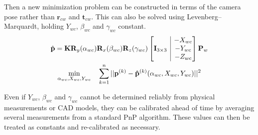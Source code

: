 \documentclass{article}
\makeatletter
\newcommand{\onebytwo}[2]{\ensuremath{\left[\begin{array}{@{}c|c@{}} #1 & #2 \end{array}\right]}}
\makeatother
\begin{document}
Then a new minimization problem can be constructed in terms of the camera pose rather than $\mathbf{r}_{cw}$ and $\mathbf{t}_{cw}$. This can also be solved using Levenberg–Marquardt, holding $Y_{wc}$, $\beta_{wc}$ and $\gamma_{wc}$ constant.
\begin{gather*}
    \hat{\mathbf{p}}=\mathbf{K} \mathbf{R}_y(\alpha_{wc}) \mathbf{R}_x(\beta_{wc}) \mathbf{R}_z(\gamma_{wc}) \onebytwo{\mathbf{I}_{3 \times 3}}{\begin{matrix}-X_{wc} \\ -Y_{wc} \\ -Z_{wc}\end{matrix}}  \mathbf{P}_w \\
    \min_{\alpha_{wc}, X_{wc}, Y_{wc}} \quad \sum_{k=1}^{n}{||\mathbf{p}^{(k)}-\mathbf{\hat{p}}^{(k)}(\alpha_{wc}, X_{wc}, Y_{wc})||^2}
\end{gather*}

Even if $Y_{wc}$, $\beta_{wc}$ and $\gamma_{wc}$ cannot be determined reliably from physical measurements or CAD models, they can be calibrated ahead of time by averaging several measurements from a standard PnP algorithm. These values can then be treated as constants and re-calibrated as necessary.



\end{document}
